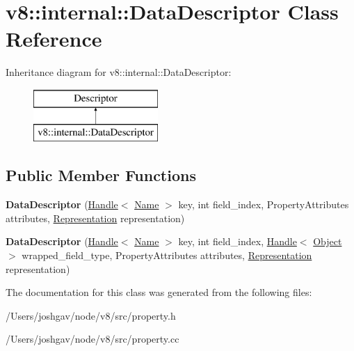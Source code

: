\hypertarget{classv8_1_1internal_1_1_data_descriptor}{}\section{v8\+:\+:internal\+:\+:Data\+Descriptor Class Reference}
\label{classv8_1_1internal_1_1_data_descriptor}
Inheritance diagram for v8\+:\+:internal\+:\+:Data\+Descriptor\+:\begin{figure}[H]
\begin{center}
\leavevmode
\includegraphics[height=2.000000cm]{classv8_1_1internal_1_1_data_descriptor}
\end{center}
\end{figure}
\subsection*{Public Member Functions}
\begin{DoxyCompactItemize}
\item 
{\bfseries Data\+Descriptor} (\hyperlink{classv8_1_1internal_1_1_handle}{Handle}$<$ \hyperlink{classv8_1_1internal_1_1_name}{Name} $>$ key, int field\+\_\+index, Property\+Attributes attributes, \hyperlink{classv8_1_1internal_1_1_representation}{Representation} representation)\hypertarget{classv8_1_1internal_1_1_data_descriptor_aa3bde1d86e31ee2d1b03db09c696caf9}{}\label{classv8_1_1internal_1_1_data_descriptor_aa3bde1d86e31ee2d1b03db09c696caf9}

\item 
{\bfseries Data\+Descriptor} (\hyperlink{classv8_1_1internal_1_1_handle}{Handle}$<$ \hyperlink{classv8_1_1internal_1_1_name}{Name} $>$ key, int field\+\_\+index, \hyperlink{classv8_1_1internal_1_1_handle}{Handle}$<$ \hyperlink{classv8_1_1internal_1_1_object}{Object} $>$ wrapped\+\_\+field\+\_\+type, Property\+Attributes attributes, \hyperlink{classv8_1_1internal_1_1_representation}{Representation} representation)\hypertarget{classv8_1_1internal_1_1_data_descriptor_a915e06e6e9621ba74e90bf90909a2460}{}\label{classv8_1_1internal_1_1_data_descriptor_a915e06e6e9621ba74e90bf90909a2460}

\end{DoxyCompactItemize}


The documentation for this class was generated from the following files\+:\begin{DoxyCompactItemize}
\item 
/\+Users/joshgav/node/v8/src/property.\+h\item 
/\+Users/joshgav/node/v8/src/property.\+cc\end{DoxyCompactItemize}
